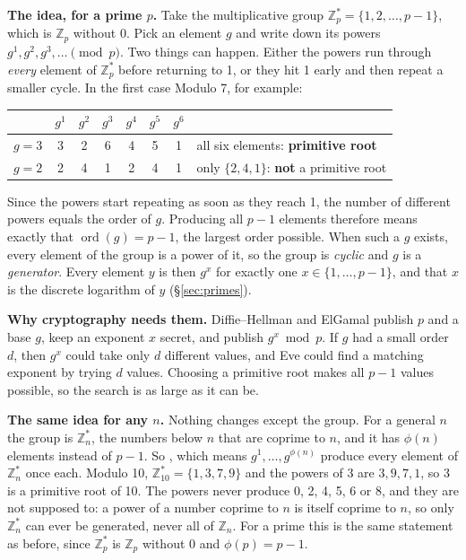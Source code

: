 \textbf{The idea, for a prime $p$.} Take the multiplicative group $\mathbb{Z}_p^* = \{1, 2, \dots, p-1\}$, which is $\mathbb{Z}_p$ without 0. Pick an element $g$ and write down its powers $g^1, g^2, g^3, \dots \pmod p$. Two things can happen. Either the powers run through \emph{every} element of $\mathbb{Z}_p^*$ before returning to 1, or they hit 1 early and then repeat a smaller cycle. In the first case  Modulo 7, for example:
\begin{center}\small
\begin{tabular}{@{}lccccccl@{}}
\toprule
 & $g^1$ & $g^2$ & $g^3$ & $g^4$ & $g^5$ & $g^6$ & \\
\midrule
$g = 3$ & 3 & 2 & 6 & 4 & 5 & 1 & all six elements: \textbf{primitive root}\\
$g = 2$ & 2 & 4 & 1 & 2 & 4 & 1 & only $\{2, 4, 1\}$: \textbf{not} a primitive root\\
\bottomrule
\end{tabular}
\end{center}
Since the powers start repeating as soon as they reach 1, the number of different powers equals the order of $g$. Producing all $p - 1$ elements therefore means exactly that \textbf{$\operatorname{ord}(g) = p - 1$}, the largest order possible. When such a $g$ exists, every element of the group is a power of it, so the group is \emph{cyclic} and $g$ is a \emph{generator}. Every element $y$ is then $g^x$ for exactly one $x \in \{1, \dots, p-1\}$, and that $x$ is the discrete logarithm of $y$ (\S\ref{sec:primes}).

\textbf{Why cryptography needs them.} Diffie--Hellman and ElGamal publish $p$ and a base $g$, keep an exponent $x$ secret, and publish $g^x \bmod p$. If $g$ had a small order $d$, then $g^x$ could take only $d$ different values, and Eve could find a matching exponent by trying $d$ values. Choosing a primitive root makes all $p - 1$ values possible, so the search is as large as it can be.

\textbf{The same idea for any $n$.} Nothing changes except the group. For a general $n$ the group is $\mathbb{Z}_n^*$, the numbers below $n$ that are coprime to $n$, and it has $\phi(n)$ elements instead of $p - 1$. So , which means $g^1, \dots, g^{\phi(n)}$ produce every element of $\mathbb{Z}_n^*$ once each. Modulo 10, $\mathbb{Z}_{10}^* = \{1, 3, 7, 9\}$ and the powers of 3 are $3, 9, 7, 1$, so 3 is a primitive root of 10. The powers never produce 0, 2, 4, 5, 6 or 8, and they are not supposed to: a power of a number coprime to $n$ is itself coprime to $n$, so only $\mathbb{Z}_n^*$ can ever be generated, never all of $\mathbb{Z}_n$. For a prime this is the same statement as before, since $\mathbb{Z}_p^*$ is $\mathbb{Z}_p$ without 0 and $\phi(p) = p - 1$.

